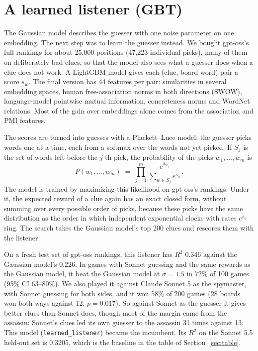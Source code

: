 \documentclass[11pt]{article}
\begin{document}
\section{A learned listener (GBT)}

The Gaussian model describes the guesser with one noise parameter on one
embedding. The next step was to learn the guesser instead. We bought gpt-oss's
full rankings for about 25,000 positions (47,223 individual picks), many of them
on deliberately bad clues, so that the model also sees what a guesser does when a
clue does not work. A LightGBM model gives each (clue, board word) pair a score
$s_w$. The final version has 44 features per pair: similarities in several
embedding spaces, human free-association norms in both directions (SWOW),
language-model pointwise mutual information, concreteness norms and WordNet
relations. Most of the gain over embeddings alone comes from the association and
PMI features.

The scores are turned into guesses with a Plackett--Luce model: the guesser picks
words one at a time, each from a softmax over the words not yet picked. If $S_j$
is the set of words left before the $j$-th pick, the probability of the picks
$w_1, \ldots, w_m$ is
\[
P(w_1, \ldots, w_m) \;=\; \prod_{j=1}^{m} \frac{e^{s_{w_j}}}{\sum_{w \in S_j} e^{s_w}}.
\]
The model is trained by maximizing this likelihood on gpt-oss's rankings. Under
it, the expected reward of a clue again has an exact closed form, without summing
over every possible order of picks, because these picks have the same
distribution as the order in which independent exponential clocks with rates
$e^{s_w}$ ring. The search takes the Gaussian model's top 200 clues and rescores
them with the listener.

On a fresh test set of gpt-oss rankings, this listener has $R^2$ 0.346 against
the Gaussian model's 0.226. In games with Sonnet guessing and the same rewards
as the Gaussian model, it beat the Gaussian model at $\sigma = 1.5$ in 72\% of
100 games (95\% CI 63--80\%). We also played it against Claude Sonnet 5 as the
spymaster, with Sonnet guessing for both sides, and it won 58\% of 200 games (28
boards won both ways against 12, $p = 0.017$). So against Sonnet as the guesser
it gives better clues than Sonnet does, though most of the margin came from the
assassin: Sonnet's clues led its own guesser to the assassin 31 times against 13.
This model (\texttt{learned\_listener}) became the incumbent. Its $R^2$ on the
Sonnet 5.5 held-out set is 0.3205, which is the baseline in the table of
Section~\ref{sec:table}.
\end{document}
